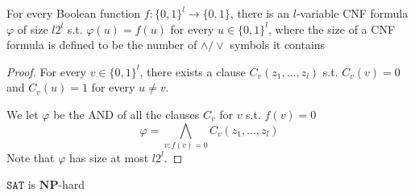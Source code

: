 \documentclass[11pt]{article}
\def \NP {\textbf{NP}}
\def \NP {\textbf{NP}}
\def \SAT {\texttt{SAT}}
\begin{document}
\begin{lemma}
\label{lemma2.13}
For every Boolean function \(f:\{0,1\}^l\to\{0,1\}\), there is an \(l\)-variable CNF formula \(\varphi\)
of size \(l2^l\) s.t. \(\varphi(u)=f(u)\) for every \(u\in\{0,1\}^l\), where the size of a CNF
formula is defined to be the number of \(\wedge/\vee\) symbols it contains
\end{lemma}

\begin{proof}
For every \(v\in\{0,1\}^l\), there exists a clause \(C_v(z_1,\dots,z_l)\) s.t. \(C_v(v)=0\)
and \(C_v(u)=1\) for every \(u\neq v\).

We let \(\varphi\) be the AND of all the clauses \(C_v\) for \(v\) s.t. \(f(v)=0\)
     \begin{equation*}
\varphi=\bigwedge_{v:f(v)=0}C_v(z_1,\dots,z_l)
     \end{equation*}
Note that \(\varphi\) has size at most \(l2^l\).
\end{proof}

\begin{lemma}[]
\(\SAT\) is \(\NP\)-hard
\end{lemma}
\end{document}
